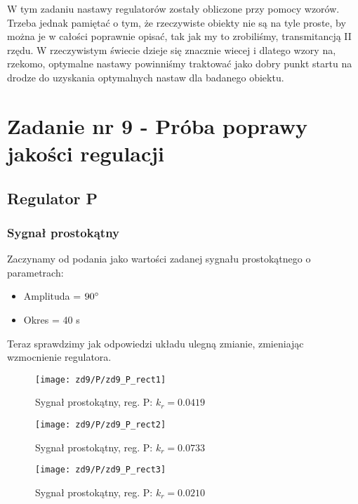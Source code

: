 \documentclass[11 pt]{article}
\begin{document}
W tym zadaniu nastawy regulatorów zostały obliczone przy pomocy wzorów. Trzeba jednak pamiętać o tym, że rzeczywiste obiekty nie są na tyle proste, by można je w całości poprawnie opisać, tak jak my to zrobiliśmy, transmitancją II rzędu. W rzeczywistym świecie dzieje się znacznie wiecej i dlatego wzory na, rzekomo, optymalne nastawy powinniśmy traktować jako dobry punkt startu na drodze do uzyskania optymalnych nastaw dla badanego obiektu.

\newpage

\setcounter{section}{9}
\setcounter{figure}{0}
\section*{Zadanie nr 9 - Próba poprawy jakości regulacji}

\subsection*{Regulator P}

\subsubsection*{Sygnał prostokątny}

Zaczynamy od podania jako wartości zadanej sygnału prostokątnego o parametrach:

\begin{itemize}
\item[]Amplituda = $90 \degree$
\item[]Okres = 40 s
\end{itemize}

Teraz sprawdzimy jak odpowiedzi układu ulegną zmianie, zmieniając wzmocnienie regulatora.

\begin{figure}[h!]
	\centerline{
	\texttt{[image: zd9/P/zd9\_P\_rect1]}
	}
	\caption{Sygnał prostokątny, reg. P: $k_r = 0.0419$}
\end{figure}

\begin{figure}[h!]
	\centerline{
	\texttt{[image: zd9/P/zd9\_P\_rect2]}
	}
	\caption{Sygnał prostokątny, reg. P: $k_r = 0.0733$}
\end{figure}

\newpage

\begin{figure}[h!]
	\centerline{
	\texttt{[image: zd9/P/zd9\_P\_rect3]}
	}
	\caption{Sygnał prostokątny, reg. P: $k_r = 0.0210$}
\end{figure}
\end{document}
